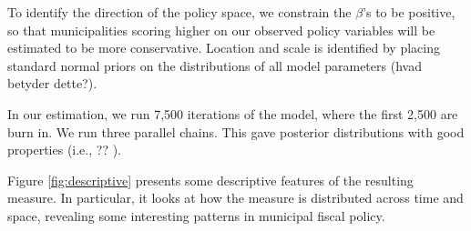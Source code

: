 \documentclass[a4paper,12pt]{article}
\begin{document}
To identify the direction of the policy space, we constrain the $\beta$'s to be positive, so that municipalities scoring higher on our observed policy variables will be estimated to be more conservative. Location and scale is identified by placing standard normal priors on the distributions of all model parameters (hvad betyder dette?).

In our estimation, we run 7,500 iterations of the model, where the first 2,500 are burn in. We run three parallel chains. This gave posterior distributions with good properties (i.e., ?? ).

Figure \ref{fig:descriptive} presents some descriptive features of the resulting measure. In particular, it looks at how the measure is distributed across time and space, revealing some interesting patterns in municipal fiscal policy.
\end{document}

